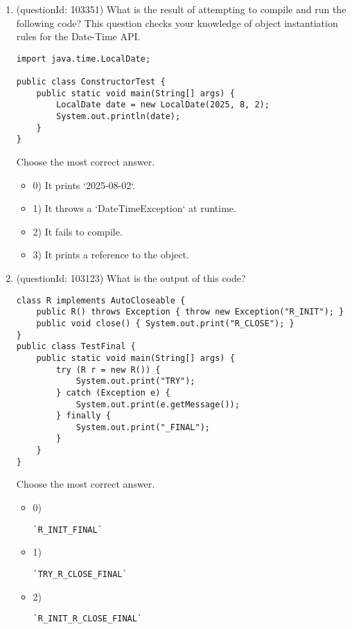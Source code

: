 \documentclass[12pt]{article}
\begin{document}
\begin{enumerate}[label=(\arabic*)]
\begin{itemize}
\end{itemize}
\item (questionId: 103351) What is the result of attempting to compile and run the following code? This question checks your knowledge of object instantiation rules for the Date-Time API.
\begin{verbatim}
import java.time.LocalDate;

public class ConstructorTest {
    public static void main(String[] args) {
        LocalDate date = new LocalDate(2025, 8, 2);
        System.out.println(date);
    }
}
\end{verbatim}
Choose the most correct answer. 
\begin{itemize}
\item 0) It prints `2025-08-02`.

\item 1) It throws a `DateTimeException` at runtime.

\item 2) It fails to compile.

\item 3) It prints a reference to the object.

\end{itemize}
\item (questionId: 103123) What is the output of this code?
\begin{verbatim}
class R implements AutoCloseable {
    public R() throws Exception { throw new Exception("R_INIT"); }
    public void close() { System.out.print("R_CLOSE"); }
}
public class TestFinal {
    public static void main(String[] args) {
        try (R r = new R()) {
            System.out.print("TRY");
        } catch (Exception e) {
            System.out.print(e.getMessage());
        } finally {
            System.out.print("_FINAL");
        }
    }
}
\end{verbatim}
Choose the most correct answer. 
\begin{itemize}
\item 0) \begin{verbatim}`R_INIT_FINAL`\end{verbatim}

\item 1) \begin{verbatim}`TRY_R_CLOSE_FINAL`\end{verbatim}

\item 2) \begin{verbatim}`R_INIT_R_CLOSE_FINAL`\end{verbatim}


\end{itemize}
\end{enumerate}
\end{document}
